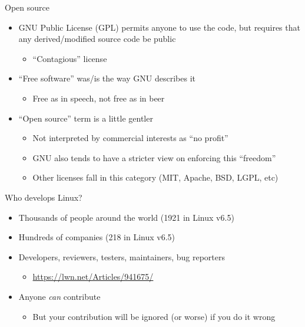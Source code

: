 \documentclass[aspectratio=169, notes]{beamer}
\begin{document}
\begin{frame}{Open source}
	\begin{itemize}
	\item GNU Public License (GPL) permits anyone to use the code, but requires that any derived/modified source code be public
		\begin{itemize}
		\item ``Contagious'' license
		\end{itemize}
	\item ``Free software'' was/is the way GNU describes it
		\begin{itemize}
		\item Free as in speech, not free as in beer
		\end{itemize}
	\item ``Open source'' term is a little gentler
		\begin{itemize}
		\item Not interpreted by commercial interests as ``no profit''
		\item GNU also tends to have a stricter view on enforcing this ``freedom''
		\item Other licenses fall in this category (MIT, Apache, BSD, LGPL, etc)
		\end{itemize}
	\end{itemize}
\end{frame}

\begin{frame}{Who develops Linux?}
	\begin{itemize}
	\item Thousands of people around the world (1921 in Linux v6.5)
	\item Hundreds of companies (218 in Linux v6.5)
	\item Developers, reviewers, testers, maintainers, bug reporters
		\begin{itemize}
		\item \url{https://lwn.net/Articles/941675/}
		\end{itemize}
	\item Anyone \emph{can} contribute
		\begin{itemize}
		\item But your contribution will be ignored (or worse) if you do it wrong
		\end{itemize}
	\end{itemize}
\end{frame}
\end{document}
